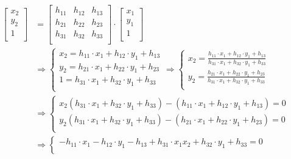 \documentclass{article}
\begin{document}
\begin{itemize}
	\begin{tcolorbox}
		[colback = Emerald!10, colframe = cyan!40!black, title = (3)求解单应矩阵]
					\begin{align}
			\left[ \begin{array}{c}
				x_2\\
				y_2\\
				1\\
			\end{array} \right] &=\left[ \begin{matrix}
				h_{11}&		h_{12}&		h_{13}\\
				h_{21}&		h_{22}&		h_{23}\\
				h_{31}&		h_{32}&		h_{33}\\
			\end{matrix} \right] \cdot \left[ \begin{array}{c}
				x_1\\
				y_1\\
				1\\
			\end{array} \right] \nonumber
			\\
			& \Rightarrow \begin{cases}
				x_2=h_{11}\cdot x_1+h_{12}\cdot y_1+h_{13}\\
				y_2=h_{21}\cdot x_1+h_{22}\cdot y_1+h_{23}\\
				1=h_{31}\cdot x_1+h_{32}\cdot y_1+h_{33}\\
			\end{cases}\Rightarrow \begin{cases}
				x_2=\frac{h_{11}\cdot x_1+h_{12}\cdot y_1+h_{13}}{h_{31}\cdot x_1+h_{32}\cdot y_1+h_{33}}\\
				y_2=\frac{h_{21}\cdot x_1+h_{22}\cdot y_1+h_{23}}{h_{31}\cdot x_1+h_{32}\cdot y_1+h_{33}}\\
			\end{cases} \nonumber
			\\
			& \Rightarrow \begin{cases}
				x_2\left( h_{31}\cdot x_1+h_{32}\cdot y_1+h_{33} \right) -\left( h_{11}\cdot x_1+h_{12}\cdot y_1+h_{13} \right) =0\\
				y_2\left( h_{31}\cdot x_1+h_{32}\cdot y_1+h_{33} \right) -\left( h_{21}\cdot x_1+h_{22}\cdot y_1+h_{23} \right) =0\\
			\end{cases} \nonumber
			\\
			& \Rightarrow \begin{cases}
				-h_{11}\cdot x_1-h_{12}\cdot y_1-h_{13}+h_{31}\cdot x_1x_2+h_{32}\cdot y_1+h_{33}=0\\

\end{cases}
\end{align}
\end{tcolorbox}
\end{itemize}
\end{document}
